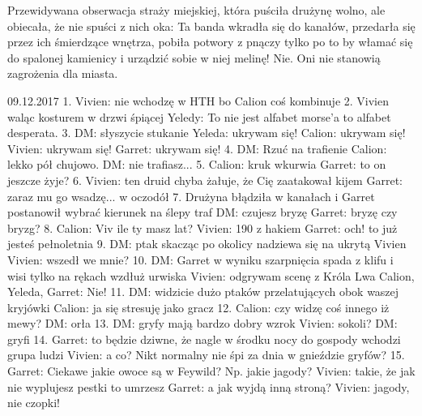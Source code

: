 \documentclass[10pt,twoside,twocolumn]{book}
\begin{document}
%       
Przewidywana obserwacja straży miejskiej, która puściła drużynę wolno, ale obiecała, że nie spuści z nich oka: Ta banda wkradła się do kanałów, przedarła się przez ich śmierdzące wnętrza, pobiła potwory z pnączy tylko po to by włamać się do spalonej kamienicy i urządzić sobie w niej melinę! Nie. Oni nie stanowią zagrożenia dla miasta.
%    
%       



09.12.2017
1. Vivien: nie wchodzę w HTH bo Calion coś kombinuje
2. Vivien waląc kosturem w drzwi śpiącej Yeledy: To nie jest alfabet morse'a to alfabet desperata.
3. DM: słyszycie stukanie Yeleda: ukrywam się! Calion: ukrywam się! Vivien: ukrywam się! Garret: ukrywam się!
4. DM: Rzuć na trafienie Calion: lekko pół chujowo. DM: nie trafiasz...
5. Calion: kruk wkurwia Garret: to on jeszcze żyje?
6. Vivien: ten druid chyba żałuje, że Cię zaatakował kijem Garret: zaraz mu go wsadzę... w oczodół
7. Drużyna błądziła w kanałach i Garret postanowił wybrać kierunek na ślepy traf DM: czujesz bryzę Garret: bryzę czy bryzg?
8. Calion: Viv ile ty masz lat? Vivien: 190 z hakiem Garret: och! to już jesteś pełnoletnia
9. DM: ptak skacząc po okolicy nadziewa się na ukrytą Vivien Vivien: wszedł we mnie?
10. DM: Garret w wyniku szarpnięcia spada z klifu i wisi tylko na rękach wzdłuż urwiska Vivien: odgrywam scenę z Króla Lwa Calion, Yeleda, Garret: Nie!
11. DM: widzicie dużo ptaków przelatujących obok waszej kryjówki Calion: ja się stresuję jako gracz
12. Calion: czy widzę coś innego iż mewy? DM: orła
13. DM: gryfy mają bardzo dobry wzrok Vivien: sokoli? DM: gryfi
14. Garret: to będzie dziwne, że nagle w środku nocy do gospody wchodzi grupa ludzi Vivien: a co? Nikt normalny nie śpi za dnia w gnieździe gryfów?
15. Garret: Ciekawe jakie owoce są w Feywild? Np. jakie jagody? Vivien: takie, że jak nie wyplujesz pestki to umrzesz Garret: a jak wyjdą inną stroną? Vivien: jagody, nie czopki!
\end{document}
